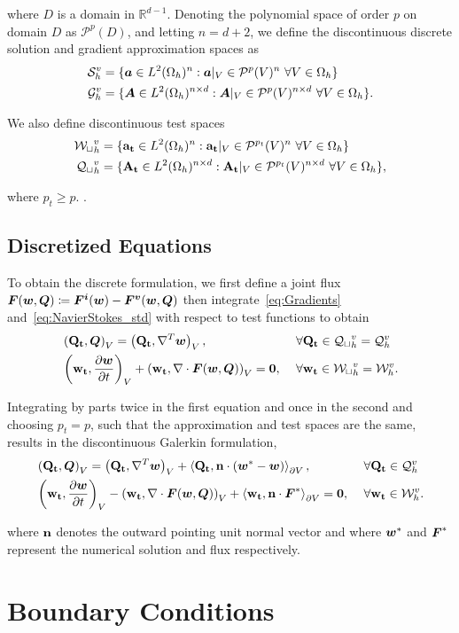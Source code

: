 where $D$ is a domain in $\mathbb{R}^{d-1}$. Denoting the polynomial space of order $p$ on domain $D$ as $\mathcal{P}^p(D)$, and letting $n = d+2$, we define the discontinuous discrete solution and gradient approximation spaces as
\begin{align*}
\mathcal{S}_h^v & = \{ \mathit{\bm{{a}}} \in L^2(\Omega_h)^{n} : \mathit{\bm{{a}}} |_V \in \mathcal{P}^p(V)^{n}\ \forall V \in \Omega_h \} \\
\mathcal{G}_h^v & = \{ \mathit{\bm{{A}}} \in L^2(\Omega_h)^{n \times d} : \mathit{\bm{{A}}} |_V \in \mathcal{P}^p(V)^{n \times d}\ \forall V \in \Omega_h \}.
\end{align*}

We also define discontinuous test spaces
\begin{align*}
\mathcal{W_t}_h^v & = \{ \mathbf{{a_t}} \in L^2(\Omega_h)^{n} : \mathbf{{a_t}} |_V \in \mathcal{P}^{p_t}(V)^{n}\ \forall V \in \Omega_h \} \\
\mathcal{Q_t}_h^v & = \{ \mathbf{{A_t}} \in L^2(\Omega_h)^{n \times d} : \mathbf{{A_t}} |_V \in \mathcal{P}^{p_t}(V)^{n \times d}\ \forall V \in \Omega_h \},
\end{align*}

where $p_t \ge p$. .

\subsection{Discretized Equations}
To obtain the discrete formulation, we first define a joint flux $\mathit{\bm{{F}}}(\mathit{\bm{{w}}},\mathit{\bm{{Q}}}) \coloneqq \mathit{\bm{{F^i}}}(\mathit{\bm{{w}}}) - \mathit{\bm{{F^v}}}(\mathit{\bm{{w}}},\mathit{\bm{{Q}}})$ then integrate~\eqref{eq:Gradients} and~\eqref{eq:NavierStokes_std} with respect to test functions to obtain
\begin{alignat*}{3}
& \left(\vect{Q_t},\varv{Q} \right)_V = \left(\vect{Q_t},\nabla^T \varv{w}\right)_V, && \forall \vect{Q_t} \in \mathcal{Q_t}_h^v = \mathcal{Q}_h^v \\
& \left(\vect{w_t},\frac{\partial \varv{w}}{\partial t} \right)_V + 
\left(\vect{w_t}, \nabla \cdot \varv{F}(\varv{w},\varv{Q}) \right)_V = \vect{0},\ && \forall \vect{w_t} \in \mathcal{W_t}_h^v = \mathcal{W}_h^v.
\end{alignat*}

Integrating by parts twice in the first equation and once in the second and choosing $p_t = p$, such that the approximation and test spaces are the same, results in the discontinuous Galerkin formulation,
\begin{alignat*}{3}
& \left(\vect{Q_t},\varv{Q} \right)_V
=
\left(\vect{Q_t},\nabla^T \varv{w}\right)_V
+
\left<\vect{Q_t},\vect{n} \cdot \left(\varv{w}^*-\varv{w} \right)\right>_{\partial V},\ && \forall \vect{Q_t} \in \mathcal{Q}_h^v \\
& \left(\vect{w_t},\frac{\partial \varv{w}}{\partial t} \right)_V
- 
\left(\vect{w_t}, \nabla \cdot \varv{F}(\varv{w},\varv{Q}) \right)_V
+
\left<\vect{w_t}, \vect{n} \cdot \varv{F}^* \right>_{\partial V}
= \vect{0},\ && \forall \vect{w_t} \in \mathcal{W}_h^v.
\end{alignat*}

where $\mathbf{{n}}$ denotes the outward pointing unit normal vector and where $\mathit{\bm{{w}}}^*$ and $\mathit{\bm{{F}}}^*$ represent the numerical solution and flux respectively.


\section{Boundary Conditions}


